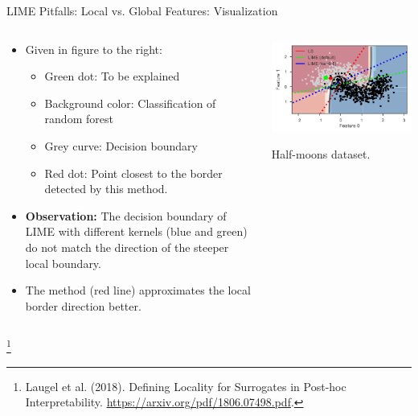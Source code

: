 \documentclass[11pt,compress,t,notes=noshow, aspectratio=169, xcolor=table]{beamer}
\begin{document}
\begin{vbframe}{LIME Pitfalls: Local vs. Global Features: Visualization }

\begin{columns}
	\begin{column}{0.6\textwidth}
		\begin{itemize}
		\item Given in figure to the right:
		\begin{itemize}
		    \item Green dot: To be explained
		    \item Background color: Classification of random forest
		    \item Grey curve: Decision boundary
		    \item Red dot: Point closest to the border detected by this method. 
		\end{itemize}
		\item \textbf{Observation: }The decision boundary of LIME with different kernels (blue and green) do not match the direction of the steeper local boundary. 
		\item The method  (red line) approximates the local border direction better. 
	\end{itemize}
\end{column}
\begin{column}{0.39\textwidth}
\vspace{0.3cm}

	\begin{center}
	\includegraphics[width=1\textwidth]{figure/lime-globallocal2}
	
	\vspace{-0.3cm}
	{Half-moons dataset.}
	
\end{center}

	\end{column}
\end{columns}
\footnote[frame]{Laugel et al. (2018). Defining Locality for Surrogates in Post-hoc Interpretability. \url{https://arxiv.org/pdf/1806.07498.pdf}.}
\end{vbframe}
\end{document}
